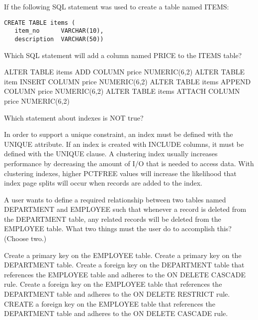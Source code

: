 \documentclass[11pt]{exam}
\begin{document}
\begin{questions}
\question[1]
If the following SQL statement was used to create a table named ITEMS:
\begin{verbatim}
CREATE TABLE items (
   item_no      VARCHAR(10),
   description  VARCHAR(50))
\end{verbatim}
Which SQL statement will add a column named PRICE to the ITEMS table?
\begin{choices}
\choice ALTER TABLE items ADD COLUMN price NUMERIC(6,2)
\choice ALTER TABLE item INSERT COLUMN price NUMERIC(6,2)
\choice ALTER TABLE items APPEND COLUMN price NUMERIC(6,2)
\choice ALTER TABLE items ATTACH COLUMN price NUMERIC(6,2)
\end{choices}

\question[1]
Which statement about indexes is NOT true?
\begin{choices}
\choice In order to support a unique constraint, an index must be defined with the UNIQUE attribute.
\choice If an index is created with INCLUDE columns, it must be defined with the UNIQUE clause.
\choice A clustering index usually increases performance by decreasing the amount of I/O that is needed to access data.
\choice With clustering indexes, higher PCTFREE values will increase the likelihood that index page splits will occur
when records are added to the index.
\end{choices}

\question[1]
A user wants to define a required relationship between two tables named DEPARTMENT and EMPLOYEE such that whenever
a record is deleted from the DEPARTMENT table, any related records will be deleted from the EMPLOYEE table. What two
things must the user do to accomplish this? (Choose two.)
\begin{choices}
\choice Create a primary key on the EMPLOYEE table.
\choice Create a primary key on the DEPARTMENT table.
\choice Create a foreign key on the DEPARTMENT table that references the EMPLOYEE table
and adheres to the ON DELETE CASCADE rule.
\choice Create a foreign key on the EMPLOYEE table that references the DEPARTMENT table and adheres to the ON DELETE
RESTRICT rule.
\choice CREATE a foreign key on the EMPLOYEE table that references the DEPARTMENT table and adheres to the ON DELETE
CASCADE rule.
\end{choices}

\question[1]

\begin{choices}
\choice 
\choice 
\choice 
\choice 
\end{choices}





\end{questions}
\end{document}
